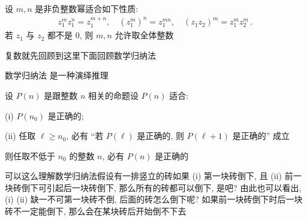 \begin{proposition}
    设 $m,n$ 是非负整数\period 幂适合如下性质:
    \begin{align*}
        z_1^m z_1^n = z_1^{m+n}, \quad (z_1^m)^n = z_1^{mn}, \quad (z_1 z_2)^m = z_1^m z_2^m \period
    \end{align*}
    若 $z_1$ 与 $z_2$ 都不是 $0$, 则 $m,n$ 允许取全体整数\period
\end{proposition}

复数就先回顾到这里\period 下面回顾数学归纳法\period

\begin{remark}
    数学归纳法  是一种演绎推理\period
\end{remark}

\begin{proposition}
    设 $P(n)$ 是跟整数 $n$ 相关的命题\period 设 $P(n)$ 适合:

    (i) $P(n_0)$ 是正确的;

    (ii) 任取 $\ell \geq n_0$, 必有 ``若 $P(\ell)$ 是正确的, 则 $P(\ell + 1)$ 是正确的'' 成立\period

    则任取不低于 $n_0$ 的整数 $n$, 必有 $P(n)$ 是正确的\period
\end{proposition}

\begin{remark}
    可以这么理解数学归纳法\period 假设有一排竖立的砖\period 如果 (i) 第一块砖倒下, 且 (ii) 前一块砖倒下可引起后一块砖倒下, 那么所有的砖都可以倒下, 是吧? 由此也可以看出, (i) (ii) 缺一不可\period 第一块砖不倒, 后面的砖怎么倒下呢? 如果前一块砖倒下时后一块砖不一定能倒下, 那么会在某块砖后开始倒不下去\period
\end{remark}

